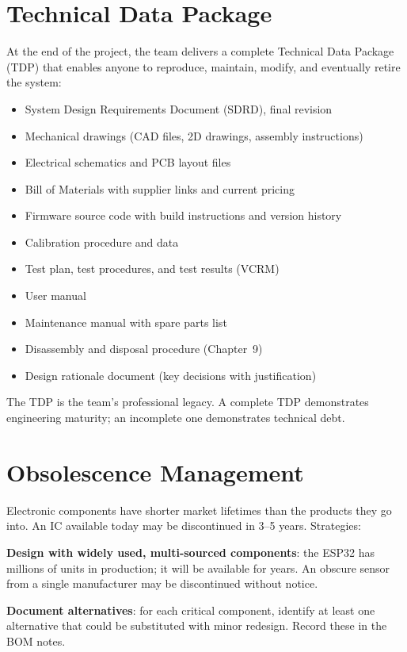 \section{Technical Data Package}
At the end of the project, the team delivers a complete Technical Data Package (TDP) that enables anyone to reproduce, maintain, modify, and eventually retire the system:

\begin{itemize}[nosep,leftmargin=1.5em]
\item System Design Requirements Document (SDRD), final revision
\item Mechanical drawings (CAD files, 2D drawings, assembly instructions)
\item Electrical schematics and PCB layout files
\item Bill of Materials with supplier links and current pricing
\item Firmware source code with build instructions and version history
\item Calibration procedure and data
\item Test plan, test procedures, and test results (VCRM)
\item User manual
\item Maintenance manual with spare parts list
\item Disassembly and disposal procedure (Chapter~9)
\item Design rationale document (key decisions with justification)
\end{itemize}

The TDP is the team's professional legacy. A complete TDP demonstrates engineering maturity; an incomplete one demonstrates technical debt.

\section{Obsolescence Management}
Electronic components have shorter market lifetimes than the products they go into. An IC available today may be discontinued in 3--5 years. Strategies:

\textbf{Design with widely used, multi-sourced components}: the ESP32 has millions of units in production; it will be available for years. An obscure sensor from a single manufacturer may be discontinued without notice.

\textbf{Document alternatives}: for each critical component, identify at least one alternative that could be substituted with minor redesign. Record these in the BOM notes.

